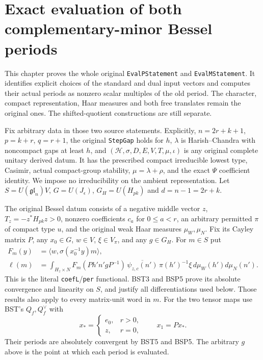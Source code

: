 \section{Exact evaluation of both complementary-minor Bessel periods}
\label{sec:bessel-period-evaluation-v51}

This chapter proves the whole original \texttt{EvalPStatement} and
\texttt{EvalMStatement}.  It identifies explicit choices of the
standard and dual input vectors and computes their actual periods as
nonzero scalar multiples of the old period.  The character, compact
representation, Haar measures and both free translates remain the
original ones.  The shifted-quotient constructions are still separate.

Fix arbitrary data in those two source statements.  Explicitly,
$n=2r+k+1$, $p=k+r$, $q=r+1$, the original
\texttt{StepGap} holds for $h$, $\lambda$ is Harish--Chandra with
noncompact gaps at least $h$, and
$(\mathcal H,\sigma,D,E,V,T,\mu,\iota)$ is any original complete
unitary derived datum.  It has the prescribed compact irreducible
lowest type, Casimir, actual compact-group stability,
$\mu=\lambda+\rho$, and the exact $\Psi$ coefficient identity.
We impose no irreducibility on the ambient representation.
Let $S=U(\mathfrak{gl}_n)V$, $G=U(J_\epsilon)$,
$G_H=U(H_{pk})$ and $d=n-1=2r+k$.

The original Bessel datum consists of a negative middle vector $z$,
$T_z=-z^*H_{pk}z>0$, nonzero coefficients $c_a$ for $0\le a<r$,
an arbitrary permitted $\pi$ of compact type $u$, and the original
weak Haar measures $\mu_W,\mu_N$.  Fix its Cayley matrix $P$,
any $x_0\in G$, $w\in V$, $\xi\in V_\pi$, and any $g\in G_H$.
For $m\in S$ put
\[
 \begin{split}
 F_m(y)&=\langle w,\sigma(x_0^{-1}y)m\rangle,\\
 \ell(m)&=\int_{H_z\times N}
       F_m(P h'n'gP^{-1})\,
       \overline{\psi_{z,c}(n')}\,\pi(h')^{-1}\xi\,
                    d\mu_W(h')d\mu_N(n').
 \end{split}
 \tag{BSE.1}
\]
This is the literal \texttt{coefL}/\texttt{per} functional.
BST3 and BSP5 prove its absolute convergence and linearity on $S$,
and justify all differentiations used below.  Those results also
apply to every matrix-unit word in $m$.
For the two tensor maps use BST's $Q_f,Q_f^\vee$ with
\[
 x_*= \begin{cases}e_0,&r>0,\\ z,&r=0,\end{cases}
                  \qquad x_1=P x_* .
 \tag{BSE.2}
\]
Their periods are absolutely convergent by BST5 and BSP5.
The arbitrary $g$ above is the point at which each period is evaluated.

